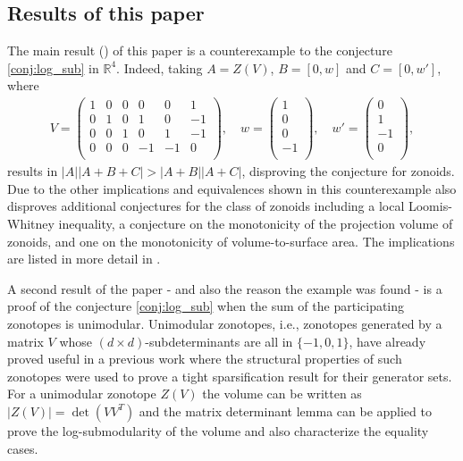 \documentclass{article}
\newcommand{\R}{\mathbb{R}}
\theoremstyle{theorem}
\theoremstyle{remark}
\begin{document}
\subsection{Results of this paper}

The main result () of this paper is a counterexample to the conjecture \cref{conj:log_sub} in $\R^4$. Indeed, taking $A= Z(V)$, $B= [0,w]$ and $C=[0,w']$, where
\begin{align*}
    V = \begin{pmatrix}
    1& 0& 0&  0&  0& 1\\
    0& 1& 0&  1&  0&-1\\
    0& 0& 1&  0&  1&-1\\
    0& 0& 0& -1& -1& 0\\
    \end{pmatrix}, 
    \quad w = \begin{pmatrix}
    1\\
    0\\
    0\\
    -1\\
    \end{pmatrix},
    \quad w'= \begin{pmatrix}
    0\\
    1\\
    -1\\
    0\\
    \end{pmatrix},
\end{align*}
results in $|A||A+B+C| >|A+B||A+C|$, disproving the conjecture for zonoids. Due to the other implications and equivalences shown in \citet{fradelizi2024volume} this counterexample also disproves additional conjectures for the class of zonoids including a local Loomis-Whitney inequality, a conjecture on the monotonicity of the projection volume of zonoids, and one on the monotonicity of volume-to-surface area. The implications are listed in more detail in .
\par

A second result of the paper - and also the reason the example was found - is a proof of the conjecture \cref{conj:log_sub} when the sum of the participating zonotopes is unimodular. Unimodular zonotopes, i.e., zonotopes generated by a matrix $V$ whose $(d\times d)$-subdeterminants are all in $\{-1,0,1\}$, have already proved useful in a previous work \cite{eisenbrand2026nearly} where the structural properties of such zonotopes were used to prove a tight sparsification result for their generator sets. For a unimodular zonotope $Z(V)$ the volume can be written as $|Z(V)| = \det(VV^T)$ and the matrix determinant lemma can be applied to prove the log-submodularity of the volume and also characterize the equality cases. 
\end{document}
